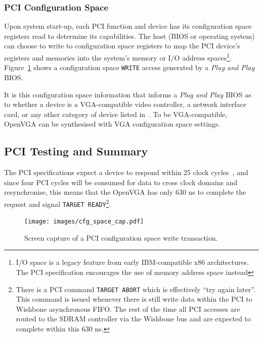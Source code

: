 

\subsubsection{PCI Configuration Space}
Upon system start-up, each PCI function and device has its configuration space
registers read to determine its capabilities. The host (BIOS or operating system)
can choose to write to configuration space registers to map the PCI device's
registers and memories into the system's memory or I/O address
spaces\footnote{I/O space is a legacy feature from early IBM-compatible x86
architectures. The PCI specification encourages the use of memory address space
instead\cite{PCI_Spec, PCI_Book}}. Figure~\ref{PCI_CFG_Cap} shows a configuration
space \texttt{WRITE} access generated by a \textit{Plug and Play} BIOS.

It is this configuration space information that informs a \textit{Plug and Play}
BIOS as to whether a device is a VGA-compatible video controller, a network
interface card, or any other category of device listed in~\cite{PCI_Spec}. To be
VGA-compatible, OpenVGA can be synthesised with VGA configuration space settings.


\subsection{PCI Testing and Summary}
The PCI specifications expect a device to respond within 25 clock
cycles~\cite{PCI_Spec}, and since four PCI cycles will be consumed for data to
cross clock domains and resynchronise, this means that the OpenVGA has only 630
ns to complete the request and signal \texttt{TARGET READY}\footnote{There is a
PCI command \texttt{TARGET ABORT} which is effectively ``try again later''. This
command is issued whenever there is still write data within the PCI to Wishbone
asynchronous FIFO. The rest of the time all PCI accesses are routed to the SDRAM
controller via the Wishbone bus and are expected to complete within this 630
ns.}.

\begin{figure}[h!]
\begin{center}
\texttt{[image: images/cfg\_space\_cap.pdf]}
\end{center}
\caption[PCI configuration space write transaction]{Screen capture of a PCI
configuration space write transaction.}
\label{PCI_CFG_Cap}
\end{figure}


